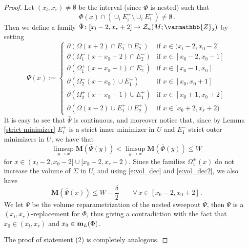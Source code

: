 \documentclass[12pt,twoside]{amsart}
\numberwithin{equation}{section}
\renewcommand{\leq}{\leqslant}
\renewcommand{\mathbb}{\varmathbb}
\newcommand{\mm}{{\bf m}}
\newcommand{\bM}{\mathbf{M}}
\begin{document}
\begin{proof}
	Let $(x_l,x_r)\neq \emptyset$ be the interval (since $\Phi$ is nested) such that
	$$
	\Phi(x) \cap (\cup_i E_i^+\setminus \cup_i E_i^-)\neq \emptyset \, .
	$$
	Then we define a family $\bar \Psi\colon [x_l-2, x_r+2] \to \mathcal{Z}_{n}(M; \mathbb{Z}_2)$ by setting
	$$
	\bar \Psi(x):=
	\begin{cases}
	\partial\left(\Omega(x+2)\cap E_1^-\cap E_2^-\right) & \text{if } x\in (x_l-2,x_0-2]\\
	\partial \left(\Omega_1^-(x-x_0+2)\cap E_2^- \right) & \text{if } x\in [x_0-2,x_0-1]\\
	\partial \left(\Omega_1^+(x-x_0+1)\cap E_2^-\right) & \text{if } x\in [x_0-1,x_0]\\
	\partial \left(\Omega_2^-(x-x_0)\cup E_1^+\right) & \text{if } x\in [x_0,x_0+1]\\
	\partial \left(\Omega_2^+(x-x_0-1) \cup E_1^+\right) & \text{if } x\in [x_0+1,x_0+2]\\
	\partial\left(\Omega(x-2)\cup E_1^+\cup E_2^+\right) & \text{if } x\in [x_0+2,x_r+2)
	\end{cases}
	$$
	It is easy to see that $\bar \Psi$ is continuous, and moreover notice that, since by Lemma \ref{strict minimizer} $E_1^+$ is a strict inner minimizer in $U$ and $E_{1}^-$ strict outer minimizers in $U$, we have that
	$$
	\limsup_{y\to x} \bM (\bar \Psi(y)) < \limsup_{y\to x} \bM(\bar\Phi(y)) \leq W 
	$$
	for $x\in(x_l-2,x_0-2] \cup [x_0-2,x_r-2)$.
	Since the families $\Omega_1^\pm(x)$ do not increase the volume of $\Sigma$ in $U_i$ and using \eqref{e:vol_dec} and \eqref{e:vol_dec2}, we also have
	$$
	\bM (\bar \Psi(x)) \leq W -\frac{\delta}{2} \qquad \forall \, x\in [x_0-2, x_0+2]\,.
	$$
	We let $\Psi$ be the volume reparametrization of the nested sweepout $\bar \Psi$, then $\Psi$ is a $(x_l,x_r)$-replacement for $\Phi$, thus giving a contradiction with the fact that $x_0\in (x_l,x_r)$ and $x_0\in \mm_L(\Phi)$.
	
	The proof of statement (2) is completely analogous.
\end{proof}


\end{document}
